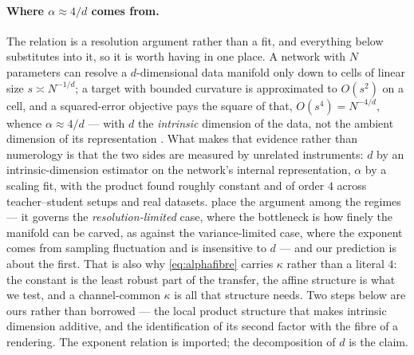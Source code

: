 \paragraph{Where \(\alpha \approx 4/d\) comes from.}
The relation is a resolution argument rather than a fit, and everything below
substitutes into it, so it is worth having in one place.
A network with \(N\) parameters can resolve a \(d\)-dimensional data manifold
only down to cells of linear size \(s \asymp N^{-1/d}\);
a target with bounded curvature is approximated to \(O(s^{2})\) on a cell, and a
squared-error objective pays the square of that, \(O(s^{4}) = N^{-4/d}\), whence
\(\alpha \approx 4/d\) --- with \(d\) the \emph{intrinsic} dimension of the data,
not the ambient dimension of its representation \citep{sharma2022manifold}.
What makes that evidence rather than numerology is that the two sides are
measured by unrelated instruments:
\(d\) by an intrinsic-dimension estimator on the network's internal
representation, \(\alpha\) by a scaling fit, with the product found roughly
constant and of order \(4\) across teacher--student setups and real datasets.
\citet{bahri2024explaining} place the argument among the regimes --- it governs
the \emph{resolution-limited} case, where the bottleneck is how finely the
manifold can be carved, as against the variance-limited case, where the exponent
comes from sampling fluctuation and is insensitive to \(d\) --- and our
prediction is about the first.
That is also why \cref{eq:alphafibre} carries \(\kappa\) rather than a literal
\(4\):
the constant is the least robust part of the transfer, the affine structure is
what we test, and a channel-common \(\kappa\) is all that structure needs.
Two steps below are ours rather than borrowed --- the local product structure
that makes intrinsic dimension additive, and the identification of its second
factor with the fibre of a rendering.
The exponent relation is imported; the decomposition of \(d\) is the claim.

